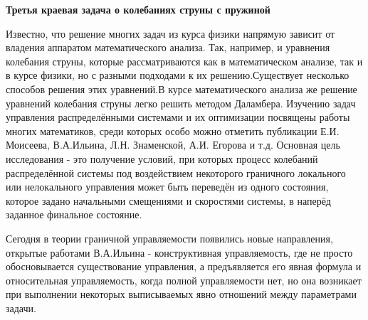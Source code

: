 \begin{center}
\textbf{Третья краевая задача о колебаниях струны с пружиной}
\end{center}


Известно, что решение многих задач из курса физики напрямую зависит от владения аппаратом математического анализа. Так, например, и уравнения колебания струны, которые рассматриваются как в математическом анализе, так и в курсе физики, но с разными подходами к их решению.Существует несколько способов решения этих уравнений.В курсе математического анализа же решение уравнений колебания струны легко решить методом Даламбера. Изучению задач управления распределёнными системами и их оптимизации посвящены работы многих математиков, среди которых особо можно отметить публикации Е.И. Моисеева, В.А.Ильина, Л.Н. Знаменской, А.И. Егорова и т.д. Основная цель исследования - это получение условий, при которых процесс колебаний распределённой системы под воздействием некоторого граничного локального или нелокального управления может быть переведён из одного состояния, которое задано начальными смещениями и скоростями системы, в наперёд заданное финальное состояние.

Сегодня в теории граничной управляемости появились новые направления, открытые работами В.А.Ильина - конструктивная управляемость, где не просто обосновывается существование управления, а предъявляется его явная формула и относительная управляемость, когда полной управляемости нет, но она возникает при выполнении некоторых выписываемых явно отношений между параметрами задачи.
